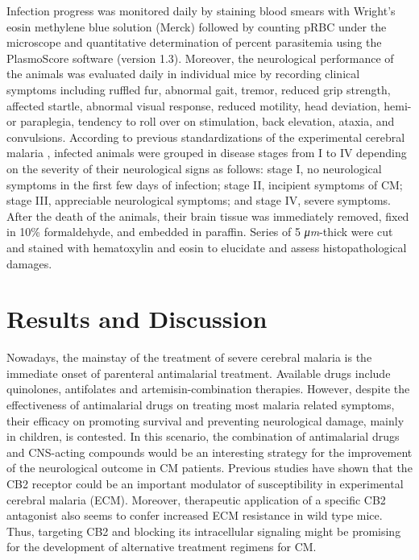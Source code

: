 \documentclass[empirical, authordate]{jote-new-article}
\begin{document}
Infection progress was monitored daily by staining blood smears with Wright's eosin methylene blue solution (Merck) followed by counting pRBC under the microscope and quantitative determination of percent parasitemia using the PlasmoScore software (version 1.3). Moreover, the neurological performance of the animals was evaluated daily in individual mice by recording clinical symptoms including ruffled fur, abnormal gait, tremor, reduced grip strength, affected startle, abnormal visual response, reduced motility, head deviation, hemi- or paraplegia, tendency to roll over on stimulation, back elevation, ataxia, and convulsions. According to previous standardizations of the experimental cerebral malaria \parencite{Martinez2013, Linares2013}, infected animals were grouped in disease stages from I to IV depending on the severity of their neurological signs as follows: stage I, no neurological symptoms in the first few days of infection; stage II, incipient symptoms of CM; stage III, appreciable neurological symptoms; and stage IV, severe symptoms. After the death of the animals, their brain tissue was immediately removed, fixed in 10\% formaldehyde, and embedded in paraffin. Series of 5 \emph{μm}-thick were cut and stained with hematoxylin and eosin to elucidate and assess histopathological damages.


\section{Results and Discussion}

\begin{originalPurpose}
  Nowadays, the mainstay of the treatment of severe cerebral malaria is the immediate onset of parenteral antimalarial treatment. Available drugs include quinolones, antifolates and artemisin-combination therapies. However, despite the effectiveness of antimalarial drugs on treating most malaria related symptoms, their efficacy on promoting survival and preventing neurological damage, mainly in children, is contested. In this scenario, the combination of antimalarial drugs and CNS-acting compounds would be an interesting strategy for the improvement of the neurological outcome in CM patients. Previous studies have shown that the CB2 receptor could be an important modulator of susceptibility in experimental cerebral malaria (ECM). Moreover, therapeutic application of a specific CB2 antagonist also seems to confer increased ECM resistance in wild type mice. Thus, targeting CB2 and blocking its intracellular signaling might be promising for the development of alternative treatment regimens for CM.
\end{originalPurpose}
\end{document}
